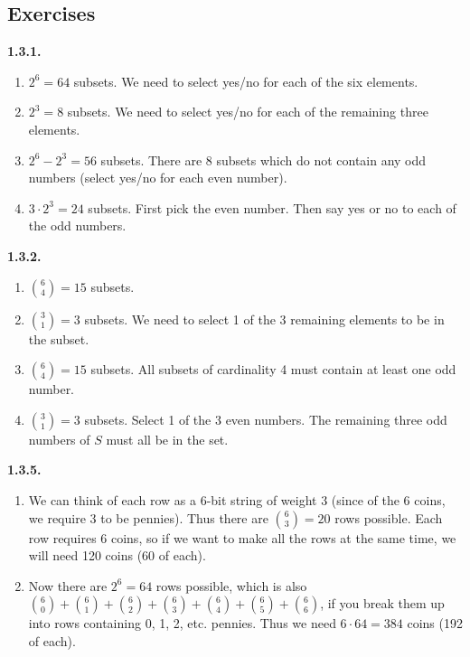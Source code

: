 \documentclass[12pt,]{book}
\theoremstyle{plain}
\theoremstyle{definition}
\theoremstyle{definition}
\theoremstyle{definition}
\numberwithin{equation}{chapter}
\begin{document}
\subsection*{ Exercises}
\noindent\textbf{1.3.1.} \hypertarget{p-870}{}%
\leavevmode%
\begin{enumerate}[label=(\alph*)]
\item\hypertarget{li-396}{}\(2^6 = 64\) subsets. We need to select yes/no for each of the six elements.%
\item\hypertarget{li-397}{}\(2^3 = 8\) subsets.  We need to select yes/no for each of the remaining three elements.%
\item\hypertarget{li-398}{}\(2^6 - 2^3 = 56\) subsets.  There are 8 subsets which do not contain any odd numbers (select yes/no for each even number).%
\item\hypertarget{li-399}{}\(3\cdot 2^3 = 24\) subsets.  First pick the even number.  Then say yes or no to each of the odd numbers.%
\end{enumerate}
%
\par\smallskip
\noindent\textbf{1.3.2.} \hypertarget{p-876}{}%
\leavevmode%
\begin{enumerate}[label=(\alph*)]
\item\hypertarget{li-404}{}\({6\choose 4} = 15\) subsets.%
\item\hypertarget{li-405}{}\({3 \choose 1} = 3\) subsets.  We need to select 1 of the 3 remaining elements to be in the subset.%
\item\hypertarget{li-406}{}\({6 \choose 4} = 15\) subsets.  All subsets of cardinality 4 must contain at least one odd number.%
\item\hypertarget{li-407}{}\({3 \choose 1} = 3\) subsets.  Select 1 of the 3 even numbers.  The remaining three odd numbers of \(S\) must all be in the set.%
\end{enumerate}
%
\par\smallskip
\noindent\textbf{1.3.5.} \hypertarget{p-890}{}%
\leavevmode%
\begin{enumerate}[label=(\alph*)]
\item\hypertarget{li-418}{}\hypertarget{p-891}{}%
We can think of each row as a 6-bit string of weight 3 (since of the 6 coins, we require 3 to be pennies).  Thus there are \({6 \choose 3} = 20\) rows possible.  Each row requires 6 coins, so if we want to make all the rows at the same time, we will need 120 coins (60 of each).%
\item\hypertarget{li-419}{}\hypertarget{p-892}{}%
Now there are \(2^6 = 64\) rows possible, which is also \({6 \choose 0} + {6\choose 1} + {6 \choose 2} + {6 \choose 3} + {6 \choose 4} + {6 \choose 5} + {6 \choose 6}\), if you break them up into rows containing 0, 1, 2, etc. pennies.  Thus we need \(6 \cdot 64 = 384\) coins (192 of each).%
\end{enumerate}
\end{document}
